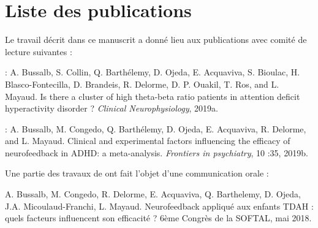 \section{Liste des publications}

Le travail décrit dans ce manuscrit a donné lieu aux publications avec comité de lecture suivantes :

\begin{description}
\item \citet{Bussalb2019tbr} : A. Bussalb, S. Collin, Q. Barthélemy, D. Ojeda, E. Acquaviva, S. Bioulac, H. Blasco-Fontecilla,
D. Brandeis, R. Delorme, D. P. Ouakil, T. Ros, and L. Mayaud. Is there a cluster of high
theta-beta ratio patients in attention deficit hyperactivity disorder ? \textit{Clinical Neurophysiology}, 2019a.
\item \citet{Bussalb2019clinical} : A. Bussalb, M. Congedo, Q. Barthélemy, D. Ojeda, E. Acquaviva, R. Delorme,
and L. Mayaud. Clinical and experimental factors influencing the efficacy of
neurofeedback in ADHD: a meta-analysis. \textit{Frontiers in psychiatry}, 10 :35, 2019b.
\end{description}

Une partie des travaux de \citet{Bussalb2019clinical} ont fait l'objet d'une communication orale :

\noindent A. Bussalb, M. Congedo, R. Delorme, E. Acquaviva, Q. Barthelemy, D. Ojeda, J.A. Micoulaud-Franchi, L. Mayaud. Neurofeedback 
appliqué aux enfants TDAH : quels facteurs influencent son efficacité ? 6ème Congrès de la SOFTAL, mai 2018. 


